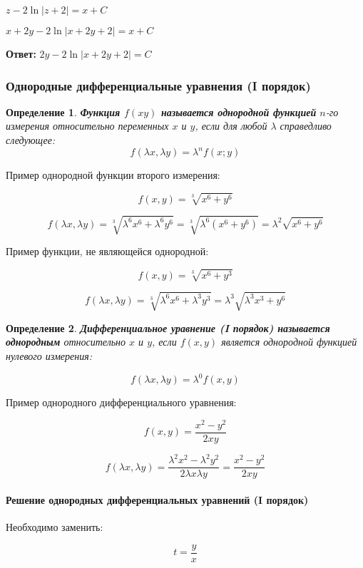 \documentclass{article}
\newtheorem{definition}{Определение}
\begin{document}
$z - 2 \ln |z + 2| = x + C$

$x + 2y - 2 \ln |x + 2y + 2| = x + C$

\textbf{Ответ:} $2y - 2 \ln |x + 2y + 2| = C$

\subsubsection{Однородные дифференциальные уравнения (I порядок)}

\begin{definition}
    \textbf{Функция $f(x y)$ называется однородной функцией} $n$-го измерения относительно переменных $x$ и $y$, если для любой $\lambda$ справедливо следующее:
    $$
    f(\lambda x, \lambda y) = \lambda^{n} f(x; y)
    $$
\end{definition}

Пример однородной функции второго измерения:

$$f(x, y) = \sqrt[3]{x^6 + y^6}$$

$$f(\lambda x, \lambda y) = \sqrt[3]{\lambda^6 x^6 + \lambda^6 y^6} = \sqrt[3]{\lambda^6 (x^6 + y^6)} = \lambda^2 \sqrt{x^6 + y^6}$$

Пример функции, не являющейся однородной:

$$f(x, y) = \sqrt[3]{x^6 + y^3}$$

$$f(\lambda x, \lambda y) = \sqrt[3]{\lambda^6 x^6 + \lambda^3 y^3} = \lambda^3 \sqrt{\lambda^3 x^3 + y^6}$$

\begin{definition}
    \textbf{Дифференциальное уравнение (I порядок) называется однородным} относительно $x$ и $y$, если $f(x, y)$ является однородной функцией нулевого измерения:

    $$f(\lambda x, \lambda y) = \lambda^{0} f(x, y)$$
\end{definition}

Пример однородного дифференциального уравнения:

$$f(x, y) = \frac{x^2 - y^2}{2xy}$$

$$f(\lambda x, \lambda y) = \frac{\lambda^2 x^2 - \lambda^2 y^2}{2 \lambda x \lambda y} = \frac{x^2 - y^2}{2xy}$$

\paragraph{Решение однородных дифференциальных уравнений (I порядок)} 

Необходимо заменить:

$$t = \frac{y}{x}$$
\end{document}
